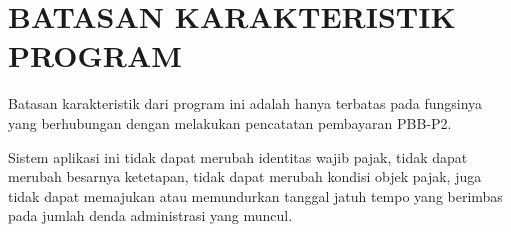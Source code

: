 \chapter{BATASAN KARAKTERISTIK PROGRAM}

Batasan karakteristik dari program ini adalah hanya terbatas pada fungsinya yang berhubungan dengan melakukan pencatatan pembayaran PBB-P2.

Sistem aplikasi ini tidak dapat merubah identitas wajib pajak, tidak dapat merubah besarnya ketetapan, tidak dapat merubah kondisi objek pajak, juga tidak dapat memajukan atau memundurkan tanggal jatuh tempo yang berimbas pada jumlah denda administrasi yang muncul.

